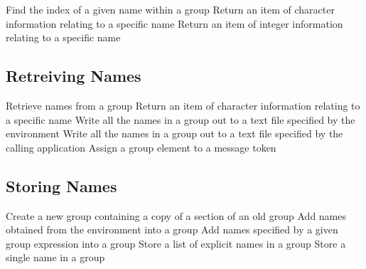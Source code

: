             {Find the index of a given name within a group}
            {Return an item of character information relating to a specific name}
            {Return an item of integer information relating to a specific name}


\subsection{Retreiving Names}

            {Retrieve names from a group}
            {Return an item of character information relating to a specific name}
            {Write all the names in a group out to a text file specified by the
environment}
            {Write all the names in a group out to a text file specified by the
calling application}
            {Assign a group element to a message token}


\subsection{Storing Names}

            {Create a new group containing a copy of a section of an old group}
            {Add names obtained from the environment into a group}
            {Add names specified by a given group expression into a group}
            {Store a list of explicit names in a group}
            {Store a single name in a group}



